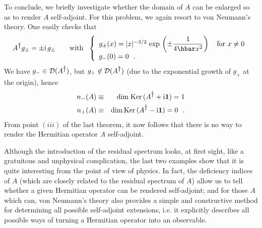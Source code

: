 \documentclass[12pt]{report}
\begin{document}
 To conclude, we briefly investigate whether    
 the domain of $A$ can be enlarged 
 so as to render $A$ self-adjoint. 
 For this problem, we again resort to von Neumann's theory. 
One easily checks that 
\[
A^{\dag} g_{\pm} = \pm \ri \, g_{\pm}
\qquad {\rm with} \ \
\left\{
\begin{array}{l}
g_{\pm} (x) =
|x|^{-3/2} \; {\rm exp} \, \left( \pm \ds{1 \over 4 \hbar x^2}
\right)  \quad {\rm for} \ x \neq 0 \\
g_- (0) = 0 \  \ .
\end{array}
\right.
\]
We have 
$g_- \in {\cal D} (A^{\dag} )$, but 
$g_+ \not\in {\cal D} (A^{\dag} )$ (due to the exponential growth of  
$g_+$ at the origin), hence 
\begin{eqnarray*}
n_- (A) & \equiv & {\rm dim \; Ker} \,
(A^{\dag} + \ri {\bf 1}) =1
\\
n_+ (A) & \equiv & {\rm dim \, Ker} \,
(A^{\dag} - \ri {\bf 1}) = 0
\ \ .
\end{eqnarray*}
From point $(iii)$ of the last theorem,
it now follows that there is no way to render the Hermitian
operator $A$ self-adjoint.

\medskip 
 
 Although the introduction of the residual spectrum looks,
 at first sight, like a 
 gratuitous and unphysical complication, the last two examples
 show that it is quite interesting from the point of view of  physics.
 In fact, 
the deficiency indices of $A$ (which are closely
 related to the residual spectrum of $A$) 
allow us to tell whether a given Hermitian operator 
can be rendered self-adjoint; and for those $A$ which can,
von Neumann's theory also  
provides a simple and
 constructive method  for determining 
all possible self-adjoint extensions,  
i.e. it explicitly describes all possible ways of turning 
 a Hermitian operator  into an observable. 
 
\end{document}
